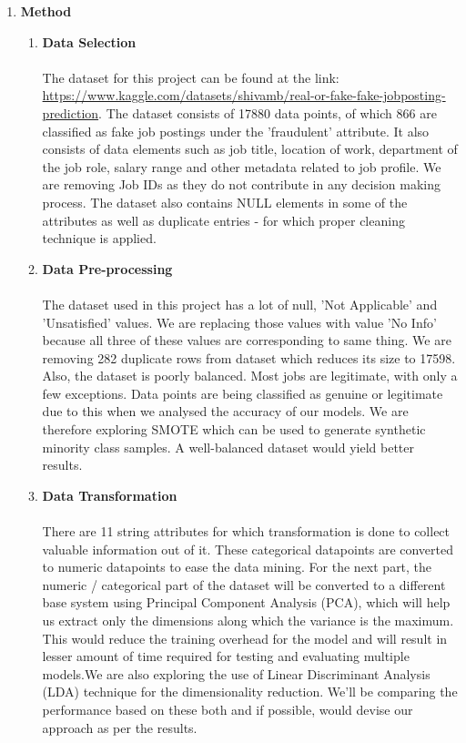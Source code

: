 \documentclass{article}
\begin{document}
\begin{enumerate}[wide, labelwidth=!, labelindent=0pt]
        \item \textbf{Method}
        \begin{enumerate}
            \item \textbf{Data Selection}\\\\
            The dataset for this project can be found at the link: \href{https://www.kaggle.com/datasets/shivamb/real-or-fake-fake-jobposting-prediction}{https://www.kaggle.com/datasets/shivamb/real-or-fake-fake-jobposting-prediction}. The dataset consists of 17880 data points, of which 866 are classified as fake job postings under the 'fraudulent' attribute. It also consists of data elements such as job title, location of work, department of the job role, salary range and other metadata related to job profile. We are removing Job IDs as they do not contribute in any decision making process. The dataset also contains NULL elements in some of the attributes as well as duplicate entries - for which proper cleaning technique is applied.\\

            \item \textbf{Data Pre-processing}\\\\
            The dataset used in this project has a lot of null, 'Not Applicable' and 'Unsatisfied' values. We are replacing those values with value 'No Info' because all three of these values are corresponding to same thing. We are removing 282 duplicate rows from dataset which reduces its size to 17598.
            Also, the dataset is poorly balanced. Most jobs are legitimate, with only a few exceptions. Data points are being classified as genuine or legitimate due to this when we analysed the accuracy of our models. We are therefore exploring SMOTE which can be used to generate synthetic minority class samples. A well-balanced dataset would yield better results.\\

            \item \textbf{Data Transformation}\\\\
            There are 11 string attributes for which transformation is done to collect valuable information out of it. These categorical datapoints are converted to numeric datapoints to ease the data mining.
            For the next part, the numeric / categorical part of the dataset will be converted to a different base system using Principal Component Analysis (PCA), which will help us extract only the dimensions along which the variance is the maximum. This would reduce the training overhead for the model and will result in lesser amount of time required for testing and evaluating multiple models.We are also exploring the use of Linear Discriminant Analysis (LDA) technique for the dimensionality reduction. We’ll be comparing the performance based on these both and if possible, would devise our approach as per the results.\\


\end{enumerate}
\end{enumerate}
\end{document}

